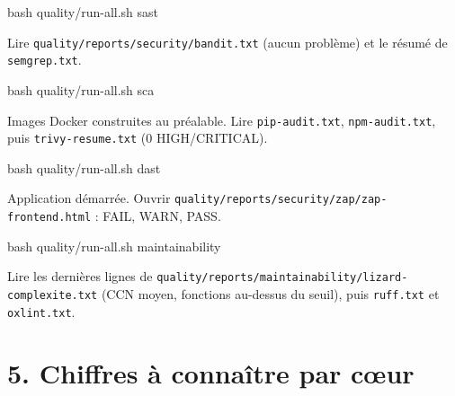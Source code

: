 \documentclass[
  11pt,
]{article}
\newenvironment{Shaded}{}{}
\newcommand{\FunctionTok}[1]{\textcolor[rgb]{0.02,0.16,0.49}{#1}}
\newcommand{\NormalTok}[1]{#1}
\begin{document}
\begin{Shaded}
\begin{Highlighting}[]
\FunctionTok{bash}\NormalTok{ quality/run{-}all.sh sast}
\end{Highlighting}
\end{Shaded}

Lire
\texttt{quality/}\allowbreak{}\texttt{reports/}\allowbreak{}\texttt{security/}\allowbreak{}\texttt{bandit.}\allowbreak{}\texttt{txt}
(aucun problème) et le résumé de \texttt{semgrep.txt}.

\begin{Shaded}
\begin{Highlighting}[]
\FunctionTok{bash}\NormalTok{ quality/run{-}all.sh sca}
\end{Highlighting}
\end{Shaded}

Images Docker construites au préalable. Lire \texttt{pip-audit.txt},
\texttt{npm-audit.txt}, puis \texttt{trivy-resume.txt} (0
HIGH/CRITICAL).

\begin{Shaded}
\begin{Highlighting}[]
\FunctionTok{bash}\NormalTok{ quality/run{-}all.sh dast}
\end{Highlighting}
\end{Shaded}

Application démarrée. Ouvrir
\texttt{quality/}\allowbreak{}\texttt{reports/}\allowbreak{}\texttt{security/}\allowbreak{}\texttt{zap/}\allowbreak{}\texttt{zap-}\allowbreak{}\texttt{frontend.}\allowbreak{}\texttt{html}
: FAIL, WARN, PASS.

\begin{Shaded}
\begin{Highlighting}[]
\FunctionTok{bash}\NormalTok{ quality/run{-}all.sh maintainability}
\end{Highlighting}
\end{Shaded}

Lire les dernières lignes de
\texttt{quality/}\allowbreak{}\texttt{reports/}\allowbreak{}\texttt{maintainability/}\allowbreak{}\texttt{lizard-}\allowbreak{}\texttt{complexite.}\allowbreak{}\texttt{txt}
(CCN moyen, fonctions au-dessus du seuil), puis \texttt{ruff.txt} et
\texttt{oxlint.txt}.

\section{5. Chiffres à connaître par
cœur}\label{5-chiffres-uxe0-connauxeetre-par-cux153ur}
\end{document}
